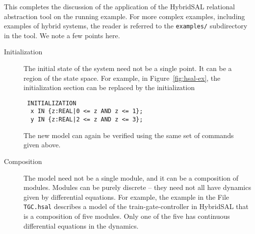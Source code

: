 \documentclass{article}
\begin{document}
This completes the discussion of the application of  the
HybridSAL relational abstraction tool on the running example.
For more complex examples, including examples of hybrid systems,
the reader is referred to the {\tt{examples/}} subdirectory in 
the tool.
We note a few points here.
\begin{description}
\item[Initialization]
The initial state of the system need not be a single point.
It can be a region of the state space.  For example,
in Figure~\ref{fig:hsal-ex}, 
the initialization section can be replaced by
the initialization 
\begin{tt}
 \begin{verbatim}
 INITIALIZATION 
  x IN {z:REAL|0 <= z AND z <= 1};
  y IN {z:REAL|2 <= z AND z <= 3};
 \end{verbatim}
\end{tt}
The new model can again be verified using the same set of commands
given above.
\item[Composition]
The model need not be a single module, and it can be a composition of 
modules.  Modules can be purely discrete -- they need not all have
dynamics given by differential equations.  For example, the example
in the File {\tt{TGC.hsal}} describes a model of the train-gate-controller
in HybridSAL that is a composition of five modules.  Only one of the
five has continuous differential equations in the dynamics.
\end{description}
\end{document}
